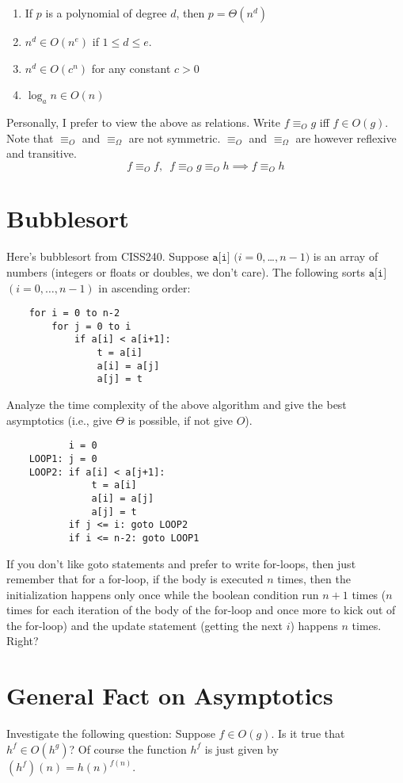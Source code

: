 \begin{thm} \mbox{}
 \begin{enumerate}
  \item If $p$ is a polynomial of degree $d$, then $p = \Theta(n^d)$
  \item $n^d \in O(n^e)$ if $1 \leq d \leq e$.
  \item $n^d \in O(c^n)$ for any constant $c>0$
  \item $\log_a n \in O(n)$
 \end{enumerate}
\end{thm}


Personally, I prefer to view the above as relations. Write $f
\equiv_O g$ iff $f \in O(g)$. Note that $\equiv_O$ and
$\equiv_\Omega$ are not symmetric. $\equiv_O$ and $\equiv_\Omega$
are however reflexive and transitive.
\[
 f \equiv_O f, \,\,\, f \equiv_O g \equiv_O h \implies f \equiv_O
 h
\]



\section{Bubblesort}

Here's bubblesort from CISS240. Suppose $\texttt{a[i]}$ $(i=0,
$\ldots$, n-1)$ is an array of numbers (integers or floats or
doubles, we don't care). The following sorts $\texttt{a[i]}$
$(i=0,\ldots,n-1)$ in ascending order:
\begin{verbatim}
    for i = 0 to n-2
        for j = 0 to i
            if a[i] < a[i+1]:
                t = a[i]
                a[i] = a[j]
                a[j] = t
\end{verbatim}


Analyze the time complexity of the above algorithm and give the
best asymptotics (i.e., give $\Theta$ is possible, if not give
$O$).

\begin{verbatim}
           i = 0
    LOOP1: j = 0
    LOOP2: if a[i] < a[j+1]:
               t = a[i]
               a[i] = a[j]
               a[j] = t
           if j <= i: goto LOOP2
           if i <= n-2: goto LOOP1
\end{verbatim}


If you don't like goto statements and prefer to write for-loops,
then just remember that for a for-loop, if the body is executed
$n$ times, then the initialization happens only once while the
boolean condition run $n+1$ times ($n$ times for each iteration of
the body of the for-loop and once more to kick out of the
for-loop) and the update statement (getting the next $i$) happens
$n$ times. Right?


\section{General Fact on Asymptotics}

Investigate the following question: Suppose $f \in O(g)$. Is it
true that $h^f \in O(h^g)$? Of course the function $h^f$ is just
given by $(h^f)(n) = h(n)^{f(n)}$.

